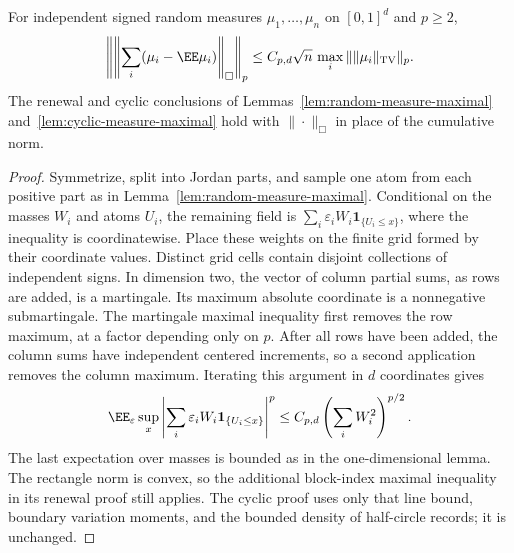 \documentclass[11pt,letterpaper]{article}
\newcommand{\ind}{\mathbf 1}\newcommand{\Exp}{\operatorname{Exp}}
\begin{document}
\begin{lemma}
\label{lem:rectangle-measure-maximal}
For independent signed random measures $\mu_1,\ldots,\mu_n$
on $[0,1]^d$ and $p\ge2$,
\[
 \left\|\left\|\sum_i(\mu_i-\EE\mu_i)\right\|_\Box\right\|_p
 \le C_{p,d}\sqrt n\,
                  \max_i\|\|\mu_i\|_{\rm TV}\|_p.
\]
The renewal and cyclic conclusions of
Lemmas~\ref{lem:random-measure-maximal}
and~\ref{lem:cyclic-measure-maximal} hold with
$\|\cdot\|_\Box$ in place of the cumulative norm.
\end{lemma}
\begin{proof}
Symmetrize, split into Jordan parts, and sample one atom from
each positive part as in Lemma~\ref{lem:random-measure-maximal}.
Conditional on the masses $W_i$ and atoms $U_i$, the remaining
field is
$\sum_i\varepsilon_iW_i\ind_{\{U_i\le x\}}$,
where the inequality is coordinatewise.
Place these weights on the finite grid formed by their
coordinate values. Distinct grid cells contain disjoint
collections of independent signs.
In dimension two, the vector of column partial sums, as rows
are added, is a martingale. Its maximum absolute coordinate
is a nonnegative submartingale. The martingale maximal
inequality first removes the row maximum, at a factor
depending only on $p$. After all rows have been added, the
column sums have independent centered increments, so a second
application removes the column maximum. Iterating this argument
in $d$ coordinates gives
\[
 \EE_\varepsilon\sup_x
 \left|\sum_i\varepsilon_iW_i\ind_{\{U_i\le x\}}\right|^p
 \le C_{p,d}\left(\sum_iW_i^2\right)^{p/2}.
\]
The last expectation over masses is bounded as in the
one-dimensional lemma. The rectangle norm is convex, so
the additional block-index maximal inequality in its renewal
proof still applies. The cyclic proof uses only that line
bound, boundary variation moments, and the bounded density
of half-circle records; it is unchanged.
\end{proof}
\end{document}
